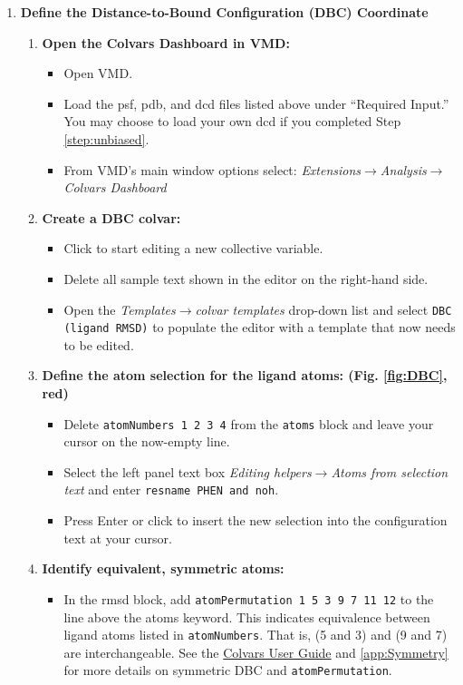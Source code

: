 \documentclass[9pt,tutorial]{Styling/livecoms}
\newcommand{\button}[1]{\inlineBox[gray]{\texttt{#1}}}
\newcommand{\menu}[1]{\textit{#1}}
\newcommand{\option}[1]{\texttt{#1}}
\newcommand{\textInput}[1]{\texttt{#1}}
\begin{document}
\begin{enumerate}
    \item \textbf{Define the Distance-to-Bound Configuration (DBC) Coordinate}
        \begin{enumerate}[label=\alph*., ref=\theenumi.\alph*]
             \item \textbf{Open the Colvars Dashboard in VMD:}
             \begin{itemize}
                \item Open VMD.
                 \item Load the psf, pdb, and dcd files listed above under ``Required Input.'' You may choose to load your own dcd if you completed Step \ref{step:unbiased}.
                 \item From VMD's main window options select: \menu{Extensions$\rightarrow$Analysis$\rightarrow$Colvars Dashboard}
             \end{itemize}
             \item \textbf{Create a DBC colvar:}
             \begin{itemize}
                 \item Click \button{New [Ctrl-n]} to start editing a new collective variable.
                \item Delete all sample text shown in the editor on the right-hand side.
                \item Open the \menu{Templates$\rightarrow$colvar templates} drop-down list and select \option{DBC (ligand RMSD)} to populate the editor with a template that now needs to be edited.
            \end{itemize}
             \item \label{step:ligNumbers}\textbf{Define the atom selection for the ligand atoms: (Fig. \ref{fig:DBC}, red)} 
             \begin{itemize}
                 \item Delete  \textInput{atomNumbers 1 2 3 4} from the \textInput{atoms} block and leave your cursor on the now-empty line.
                 \item Select the left panel text box \menu{Editing helpers$\rightarrow$Atoms from selection text} and enter \textInput{resname PHEN and noh}.
                 \item Press Enter or click \button{Insert [Enter]} to insert the new selection into the configuration text at your cursor.
            \end{itemize}
            \item \label{step:symmetry}\textbf{Identify equivalent, symmetric atoms:}
             \begin{itemize}
                 \item In the rmsd block, add \textInput{atomPermutation 1 5 3 9 7 11 12} to the line above the atoms keyword. 
                 This indicates equivalence between ligand atoms listed in \textInput{atomNumbers}. That is, (5 and 3) and (9 and 7) are interchangeable. See the \href{https://colvars.github.io/colvars-refman-vmd/colvars-refman-vmd.html#sec:cvc_rmsd}{Colvars User Guide} and \ref{app:Symmetry} for more details on symmetric DBC and \textInput{atomPermutation}.
            \end{itemize}


\end{enumerate}
\end{enumerate}
\end{document}
